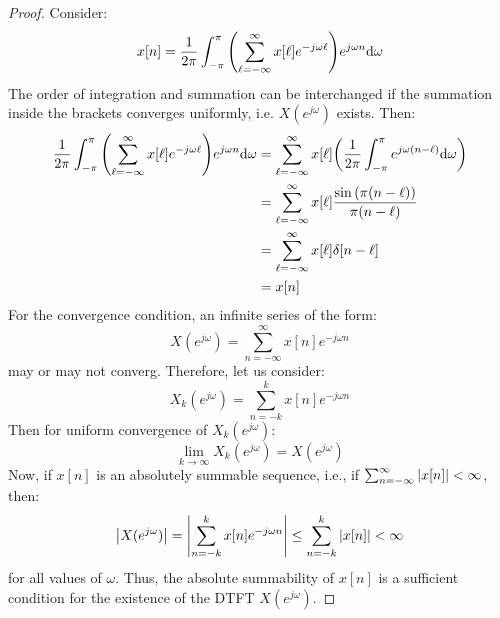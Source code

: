 \documentclass[../../main/main.tex]{subfiles}
\begin{document}
\begin{proof}
    Consider:
    \begin{equation}
        x[n]
        =
        \frac{1}{2\pi} \int_{-\pi}^{\pi} \qty(\sum_{\ell=-\infty}^{\infty} x[\ell] e^{-j\omega \ell}) e^{j\omega n} \mathrm{d}{\omega}
        \label{eq:L08_S27_2}
    \end{equation}
    The order of integration and summation can be interchanged if the summation inside the brackets converges uniformly, i.e. \( X(e^{j\omega}) \) exists. Then:
    \begin{align}
        \frac{1}{2\pi} \int_{-\pi}^{\pi} \qty(\sum_{\ell=-\infty}^{\infty} x[\ell] e^{-j\omega \ell}) e^{j\omega n} \mathrm{d}{\omega}
        &=
            \sum_{\ell=-\infty}^{\infty} x[\ell] \qty(\frac{1}{2\pi} \int_{-\pi}^{\pi} e^{j\omega (n-\ell)} \mathrm{d}{\omega}) \nonumber   \\
        &=
            \sum_{\ell=-\infty}^{\infty} x[\ell] \frac{\sin\qty(\pi(n-\ell))}{\pi (n-\ell)} \nonumber   \\
        &=
            \sum_{\ell=-\infty}^{\infty} x[\ell] \delta[n-\ell] \nonumber   \\
        &=
            x[n]
    \end{align}
    For the convergence condition, an infinite series of the form:
    \begin{equation}
        X(e^{j\omega})
        =
        \sum_{n=-\infty}^{\infty} x[n] e^{-j\omega n}
        \label{eq:L08_S30_1}
    \end{equation}
    may or may not converg. Therefore, let us consider:
    \begin{equation}
        X_{k}(e^{j\omega})
        =
        \sum_{n=-k}^{k} x[n] e^{-j\omega n}
        \label{eq:L08_S30_2}
    \end{equation}
    Then for uniform convergence of \( X_{k}(e^{j\omega}) \):
    \begin{equation}
        \lim_{k \to \infty} X_{k}(e^{j\omega})
        =
        X(e^{j\omega})
        \label{eq:L08_S31_1}
    \end{equation}
    Now, if \( x[n] \) is an absolutely summable sequence, i.e., if \( \sum_{n=-\infty}^{\infty} \abs{x[n]} < \infty \), then:
    \begin{equation}
        \abs{X(e^{j\omega})}
        =
        \abs{\sum_{n=-k}^{k} x[n] e^{-j\omega n}}
        \le
        \sum_{n=-k}^{k} \abs{x[n]}
        <
        \infty
        \label{eq:L08_S32_1}
    \end{equation}
    for all values of \( \omega \). Thus, the absolute summability of \( x[n] \) is a sufficient condition for the existence of the DTFT \( X(e^{j\omega}) \).
\end{proof}
\end{document}
